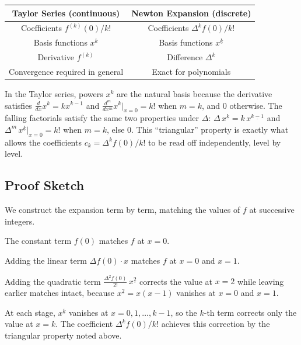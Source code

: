 \begin{center}
\renewcommand{\arraystretch}{1.5}
\begin{tabular}{|c|c|}
\hline
\textbf{Taylor Series (continuous)} & \textbf{Newton Expansion (discrete)} \\
\hline
Coefficients \(f^{(k)}(0)/k!\) & Coefficients \(\Delta^k f(0)/k!\) \\
Basis functions \(x^k\) & Basis functions \(x^{\underline{k}}\) \\
Derivative \(f^{(k)}\) & Difference \(\Delta^k\) \\
Convergence required in general & Exact for polynomials \\
\hline
\end{tabular}
\end{center}

\begin{remark*}
In the Taylor series, powers \(x^k\) are the natural basis because
the derivative satisfies \(\tfrac{d}{dx}x^k = kx^{k-1}\) and
\(\tfrac{d^m}{dx^m}x^k\big|_{x=0} = k!\) when \(m=k\), and \(0\) otherwise.
The falling factorials satisfy the same two properties under \(\Delta\):
\(\Delta\,x^{\underline{k}} = k\,x^{\underline{k-1}}\) and
\(\Delta^m\,x^{\underline{k}}\big|_{x=0} = k!\) when \(m=k\), else \(0\).
This ``triangular'' property is exactly what allows the coefficients
\(c_k = \Delta^k f(0)/k!\) to be read off independently, level by level.
\end{remark*}

\subsection*{Proof Sketch}

We construct the expansion term by term, matching the values of \(f\) at
successive integers.

The constant term \(f(0)\) matches \(f\) at \(x = 0\).

Adding the linear term \(\Delta f(0)\cdot x\) matches \(f\) at \(x = 0\)
and \(x = 1\).

Adding the quadratic term \(\tfrac{\Delta^2 f(0)}{2!}\,x^{\underline{2}}\)
corrects the value at \(x = 2\) while leaving earlier matches intact,
because \(x^{\underline{2}} = x(x-1)\) vanishes at \(x = 0\) and \(x = 1\).

At each stage, \(x^{\underline{k}}\) vanishes at \(x = 0, 1, \dots, k-1\),
so the \(k\)-th term corrects only the value at \(x = k\). The coefficient
\(\Delta^k f(0)/k!\) achieves this correction by the triangular property
noted above.


